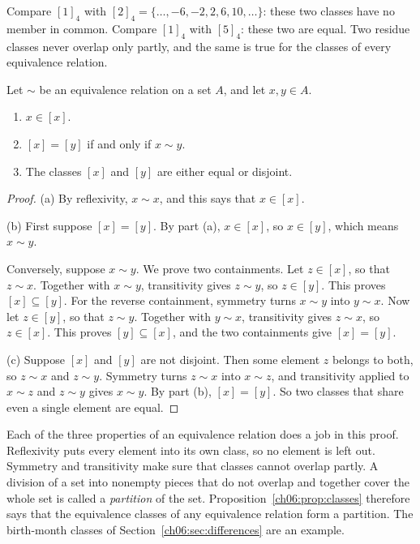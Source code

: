 Compare $[1]_4$ with $[2]_4=\{\ldots,-6,-2,2,6,10,\ldots\}$: these two classes have no member in common. Compare $[1]_4$ with $[5]_4$: these two are equal. Two residue classes never overlap only partly, and the same is true for the classes of every equivalence relation.

\par\noindent\begin{minipage}{\linewidth}
\begin{proposition}\label{ch06:prop:classes}
Let $\sim$ be an equivalence relation on a set $A$, and let $x,y\in A$.
\begin{enumerate}
\item[(a)] $x\in[x]$.
\item[(b)] $[x]=[y]$ if and only if $x\sim y$.
\item[(c)] The classes $[x]$ and $[y]$ are either equal or disjoint.
\end{enumerate}
\end{proposition}
\end{minipage}\par

\begin{proof}
(a) By reflexivity, $x\sim x$, and this says that $x\in[x]$.

(b) First suppose $[x]=[y]$. By part (a), $x\in[x]$, so $x\in[y]$, which means $x\sim y$.

Conversely, suppose $x\sim y$. We prove two containments. Let $z\in[x]$, so that $z\sim x$. Together with $x\sim y$, transitivity gives $z\sim y$, so $z\in[y]$. This proves $[x]\subseteq[y]$. For the reverse containment, symmetry turns $x\sim y$ into $y\sim x$. Now let $z\in[y]$, so that $z\sim y$. Together with $y\sim x$, transitivity gives $z\sim x$, so $z\in[x]$. This proves $[y]\subseteq[x]$, and the two containments give $[x]=[y]$.

(c) Suppose $[x]$ and $[y]$ are not disjoint. Then some element $z$ belongs to both, so $z\sim x$ and $z\sim y$. Symmetry turns $z\sim x$ into $x\sim z$, and transitivity applied to $x\sim z$ and $z\sim y$ gives $x\sim y$. By part (b), $[x]=[y]$. So two classes that share even a single element are equal.
\end{proof}

Each of the three properties of an equivalence relation does a job in this proof. Reflexivity puts every element into its own class, so no element is left out. Symmetry and transitivity make sure that classes cannot overlap partly. A division of a set into nonempty pieces that do not overlap and together cover the whole set is called a \emph{partition} of the set. Proposition~\ref{ch06:prop:classes} therefore says that the equivalence classes of any equivalence relation form a partition. The birth-month classes of Section~\ref{ch06:sec:differences} are an example.

